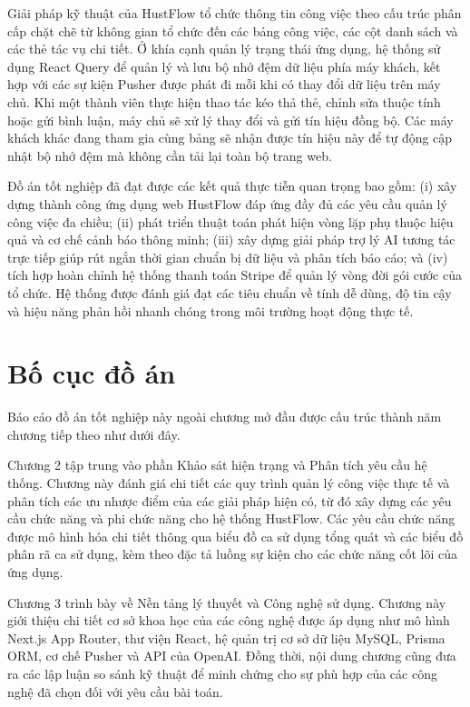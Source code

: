 \documentclass[../DoAn.tex]{subfiles}
\begin{document}
Giải pháp kỹ thuật của HustFlow tổ chức thông tin công việc theo cấu trúc phân cấp chặt chẽ từ không gian tổ chức đến các bảng công việc, các cột danh sách và các thẻ tác vụ chi tiết. Ở khía cạnh quản lý trạng thái ứng dụng, hệ thống sử dụng React Query để quản lý và lưu bộ nhớ đệm dữ liệu phía máy khách, kết hợp với các sự kiện Pusher được phát đi mỗi khi có thay đổi dữ liệu trên máy chủ. Khi một thành viên thực hiện thao tác kéo thả thẻ, chỉnh sửa thuộc tính hoặc gửi bình luận, máy chủ sẽ xử lý thay đổi và gửi tín hiệu đồng bộ. Các máy khách khác đang tham gia cùng bảng sẽ nhận được tín hiệu này để tự động cập nhật bộ nhớ đệm mà không cần tải lại toàn bộ trang web.

Đồ án tốt nghiệp đã đạt được các kết quả thực tiễn quan trọng bao gồm: (i) xây dựng thành công ứng dụng web HustFlow đáp ứng đầy đủ các yêu cầu quản lý công việc đa chiều; (ii) phát triển thuật toán phát hiện vòng lặp phụ thuộc hiệu quả và cơ chế cảnh báo thông minh; (iii) xây dựng giải pháp trợ lý AI tương tác trực tiếp giúp rút ngắn thời gian chuẩn bị dữ liệu và phân tích báo cáo; và (iv) tích hợp hoàn chỉnh hệ thống thanh toán Stripe để quản lý vòng đời gói cước của tổ chức. Hệ thống được đánh giá đạt các tiêu chuẩn về tính dễ dùng, độ tin cậy và hiệu năng phản hồi nhanh chóng trong môi trường hoạt động thực tế.

\section{Bố cục đồ án}
\label{section:1.4}

Báo cáo đồ án tốt nghiệp này ngoài chương mở đầu được cấu trúc thành năm chương tiếp theo như dưới đây.

Chương 2 tập trung vào phần Khảo sát hiện trạng và Phân tích yêu cầu hệ thống. Chương này đánh giá chi tiết các quy trình quản lý công việc thực tế và phân tích các ưu nhược điểm của các giải pháp hiện có, từ đó xây dựng các yêu cầu chức năng và phi chức năng cho hệ thống HustFlow. Các yêu cầu chức năng được mô hình hóa chi tiết thông qua biểu đồ ca sử dụng tổng quát và các biểu đồ phân rã ca sử dụng, kèm theo đặc tả luồng sự kiện cho các chức năng cốt lõi của ứng dụng.

Chương 3 trình bày về Nền tảng lý thuyết và Công nghệ sử dụng. Chương này giới thiệu chi tiết cơ sở khoa học của các công nghệ được áp dụng như mô hình Next.js App Router, thư viện React, hệ quản trị cơ sở dữ liệu MySQL, Prisma ORM, cơ chế Pusher và API của OpenAI. Đồng thời, nội dung chương cũng đưa ra các lập luận so sánh kỹ thuật để minh chứng cho sự phù hợp của các công nghệ đã chọn đối với yêu cầu bài toán.
\end{document}
